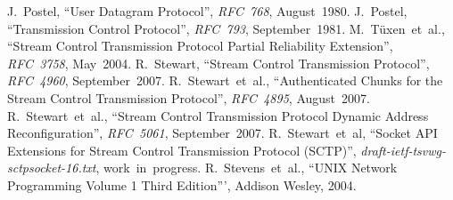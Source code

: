 \documentclass[conference]{IEEEtran}
\begin{document}
%
%
%

\begin{thebibliography}{9}
  J.~Postel,
  ``User Datagram Protocol'',
  \textit{RFC~768},
  August~1980.
  J.~Postel,
  ``Transmission Control Protocol'',
  \textit{RFC~793},
  September~1981.
  M.~T\"uxen~et~al.,
  ``Stream Control Transmission Protocol Partial Reliability Extension'',
  \textit{RFC~3758},
  May~2004.
  R.~Stewart,
  ``Stream Control Transmission Protocol'',
  \textit{RFC~4960},
  September~2007.
  R.~Stewart~et~al.,
  ``Authenticated Chunks for the Stream Control Transmission Protocol'',
  \textit{RFC~4895},
  August~2007.
  R.~Stewart~et~al.,
  ``Stream Control Transmission Protocol Dynamic Address Reconfiguration'',
  \textit{RFC~5061},
  September~2007.
  R.~Stewart~et~al,
  ``Socket API Extensions for Stream Control Transmission Protocol (SCTP)'',
  \textit{draft-ietf-tsvwg-sctpsocket-16.txt}, work~in~progress.
  R.~Stevens~et~al.,
  ``UNIX Network Programming Volume 1 Third Edition''', Addison Wesley, 2004.
\end{thebibliography}

\end{document}
